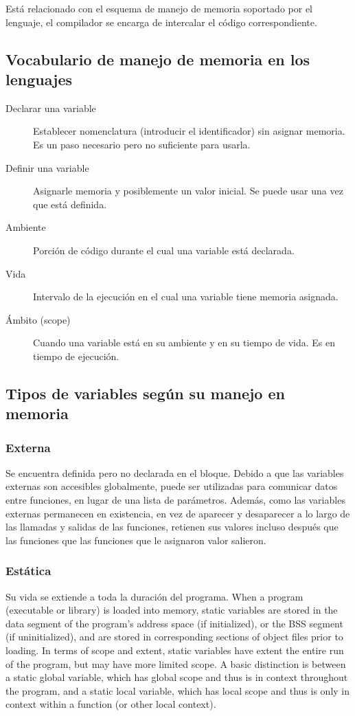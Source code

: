 \documentclass[a4paper, twoside]{article}
\begin{document}
Está relacionado con el esquema de manejo de memoria soportado por el lenguaje, el compilador se encarga de intercalar el código correspondiente.

\subsection{Vocabulario de manejo de memoria en los lenguajes}
\begin{description}
	\item[Declarar una variable] Establecer nomenclatura (introducir el identificador) sin asignar memoria. Es un paso necesario pero no suficiente para usarla.
	
	\item[Definir una variable] Asignarle memoria y posiblemente un valor inicial. Se puede usar una vez que está definida.
	
	\item[Ambiente] Porción de código durante el cual una variable está declarada.
	
	\item[Vida] Intervalo de la ejecución en el cual una variable tiene memoria asignada.
	
	\item[Ámbito (scope)] Cuando una variable está en su ambiente y en su tiempo de vida. Es en tiempo de ejecución.
\end{description}

\subsection{Tipos de variables según su manejo en memoria}
\subsubsection{Externa}
Se encuentra definida pero no declarada en el bloque.
Debido a que las variables externas son accesibles globalmente, puede ser utilizadas para comunicar datos entre funciones, en lugar de una lista de parámetros.
Además, como las variables externas permanecen en existencia, en vez de aparecer y desaparecer a lo largo de las llamadas y salidas de las funciones, retienen sus valores incluso después que las funciones que las funciones que le asignaron valor salieron.

\subsubsection{Estática}
Su vida se extiende a toda la duración del programa.
When a program (executable or library) is loaded into memory, static variables are stored in the data segment of the program's address space (if initialized), or the BSS segment (if uninitialized), and are stored in corresponding sections of object files prior to loading.
In terms of scope and extent, static variables have extent the entire run of the program, but may have more limited scope. A basic distinction is between a static global variable, which has global scope and thus is in context throughout the program, and a static local variable, which has local scope and thus is only in context within a function (or other local context).
\end{document}
